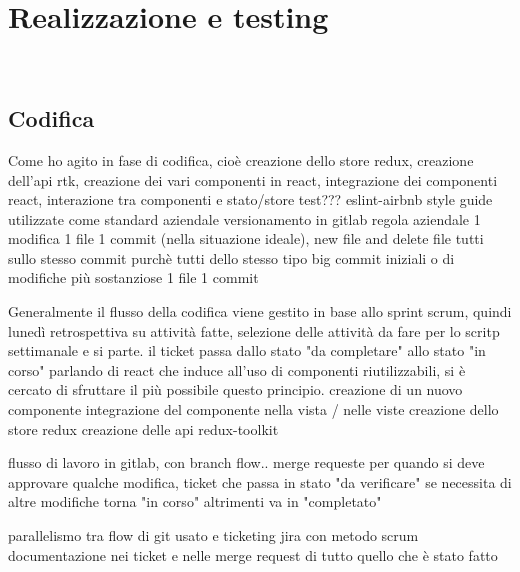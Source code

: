 
\chapter{Realizzazione e testing}
\label{cap:progettazione-codifica}

\\


\section{Codifica}
Come ho agito in fase di codifica, cioè creazione dello store redux, creazione dell'api rtk, creazione dei vari componenti in react, integrazione dei componenti react, interazione tra componenti e stato/store test???
eslint-airbnb style guide utilizzate come standard aziendale
versionamento in gitlab regola aziendale 1 modifica 1 file 1 commit (nella situazione ideale), new file and delete file tutti sullo stesso commit purchè tutti dello stesso tipo
big commit iniziali o di modifiche più sostanziose 1 file 1 commit

Generalmente il flusso della codifica viene gestito in base allo sprint scrum, quindi lunedì retrospettiva su attività fatte, selezione delle attività da fare per lo scritp settimanale e si parte.
il ticket passa dallo stato "da completare" allo stato "in corso"
parlando di react che induce all'uso di componenti riutilizzabili, si è cercato di sfruttare il più possibile questo principio.
creazione di un nuovo componente
integrazione del componente nella vista / nelle viste
creazione dello store redux
creazione delle api redux-toolkit

flusso di lavoro in gitlab, con branch flow.. merge requeste per quando si deve approvare qualche modifica, ticket che passa in stato "da verificare"
se necessita di altre modifiche torna "in corso" altrimenti va in "completato"

parallelismo tra flow di git usato e ticketing jira con metodo scrum
documentazione nei ticket e nelle merge request di tutto quello che è stato fatto